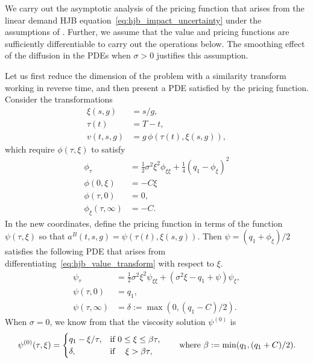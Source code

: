 \documentclass[main.tex]{subfiles}
\begin{document}
We carry out the asymptotic analysis of the pricing function
that arises from the linear demand HJB
equation~\eqref{eq:hjb_impact_uncertainty} under the assumptions of
.
Further, we assume that the value and pricing functions are sufficiently
differentiable to carry out the operations below. The smoothing effect
of the diffusion in the PDEs when $\sigma>0$ justifies this assumption.

Let us first reduce the dimension of the problem with a similarity
transform working in reverse time, and then present a PDE satisfied by the pricing function.
Consider the transformations
\begin{align}
  \xi(s,g) &= s/g,\\
  \tau(t)&=T-t,\\
  v(t,s,g)&=g\,\phi(\tau(t),\xi(s,g)),
\end{align}
which require $\phi(\tau,\xi)$ to satisfy
\begin{align}\label{eq:hjb_value_transform}
  \phi_\tau &= \frac{1}{2}\sigma^2\xi^2\phi_{\xi\xi} +
              \frac{1}{4}{(q_1 - \phi_\xi)}^2 \\
  \phi(0,\xi) &= -C\xi\\
  \phi(\tau,0)& = 0,\\
  \phi_\xi(\tau,\infty) &= -C.
\end{align}
In the new coordinates, define the pricing function in terms of the
function $\psi(\tau,\xi)$ so that $a^B(t,s,g)=\psi(\tau(t),\xi(s,g))$.
Then $\psi = (q_1+\phi_\xi)/2$ satisfies the following PDE
that arises from differentiating~\eqref{eq:hjb_value_transform} with
respect to $\xi$.
\begin{align}\label{eq:hjb_policy_transform}
  \psi_\tau&= \frac{1}{2}\sigma^2 \xi^2
             \psi_{\xi\xi} +
             (\sigma^2\xi - q_1 + \psi)\psi_\xi,\\
  \psi(\tau,0) &= q_1,\\
  \psi(\tau,\infty) &= \delta:=\max(0,(q_1-C)/2).
\end{align}
When $\sigma=0$, we know from  that
the viscosity solution $\psi^{(0)}$ is
\begin{equation}\label{eq:psi_leading}
  \psi^{(0)}(\tau,\xi)=\begin{cases}
    q_1-\xi/\tau, &\text{if } 0\leq \xi\leq
    \beta \tau,\\
    \delta,&\text{if } \hfill \xi > \beta \tau,
  \end{cases}
  \qquad \textnormal{where } \beta:=\min(q_1,(q_1+C)/2).
\end{equation}
\end{document}
